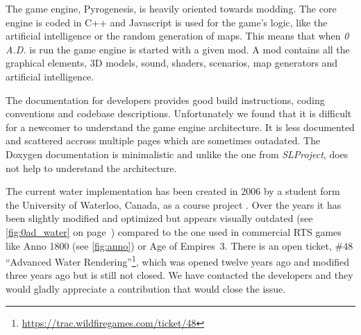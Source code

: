 The game engine, Pyrogenesis, is heavily oriented towards modding. The core
engine is coded in C++ and Javascript is used for the game's logic, like the
artificial intelligence or the random generation of maps. This means that when
\textit{0 A.D.} is run the game engine is started with a given mod. A mod
contains all the graphical elements, 3D models, sound, shaders, scenarios, map
generators and artificial intelligence.

The documentation for developers provides good build instructions, coding
conventions and codebase descriptions. Unfortunately we found that it is
difficult for a newcomer to understand the game engine architecture. It is less
documented and scattered accross multiple pages which are sometimes outadated.
The Doxygen documentation is minimalistic and unlike the one from
\textit{SLProject}, does not help to understand the architecture.

The current water implementation has been created in 2006 by a student form the
University of Waterloo, Canada, as a course project \autocite{zaharia2006cs}.
Over the years it has been slightly modified and optimized but appears visually
outdated (see \autoref{fig:0ad_water} on page~\pageref{fig:0ad_water}) compared
to the one used in commercial RTS games like Anno 1800 (see
\autoref{fig:anno}) or Age of Empires~3. There is an open ticket, \#48
``Advanced Water
Rendering''\footnote{\url{https://trac.wildfiregames.com/ticket/48}}, which was
opened twelve years ago and modified three years ago but is still not closed.
We have contacted the developers and they would gladly appreciate a contribution
that would close the issue.

